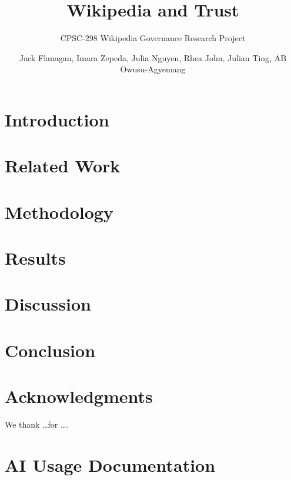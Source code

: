 \documentclass[sigconf,screen]{acmart}
\title{Wikipedia and Trust}
\subtitle{CPSC-298 Wikipedia Governance Research Project}
\author{Jack Flanagan, Imara Zepeda, Julia Nguyen, Rhea John, Julian Ting, AB Owusu-Agyemang}
\affiliation{%
  \institution{Chapman}
  \city{Orange}
  \country{USA}
}
\begin{document}
\maketitle

\section{Introduction}


\section{Related Work}


\section{Methodology}


\section{Results}


\section{Discussion}


\section{Conclusion}


\section*{Acknowledgments}
We thank \dots for \ldots.




\appendix
\section{AI Usage Documentation}

\end{document}
